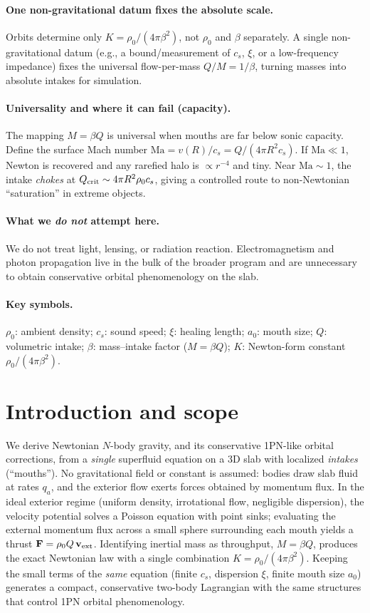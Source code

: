 \documentclass[11pt]{article}
\numberwithin{equation}{section}
\theoremstyle{plain}
\theoremstyle{remark}
\theoremstyle{definition}
\begin{document}
\paragraph{One non-gravitational datum fixes the absolute scale.}
Orbits determine only $K=\rho_0/(4\pi\beta^2)$, not $\rho_0$ and $\beta$ separately. A single non-gravitational datum (e.g., a bound/measurement of $c_s$, $\xi$, or a low-frequency impedance) fixes the universal flow-per-mass $Q/M=1/\beta$, turning masses into absolute intakes for simulation.

\paragraph{Universality and where it can fail (capacity).}
The mapping $M=\beta Q$ is universal when mouths are far below sonic capacity. Define the surface Mach number $\mathrm{Ma}=v(R)/c_s=Q/(4\pi R^2 c_s)$. If $\mathrm{Ma}\ll1$, Newton is recovered and any rarefied halo is $\propto r^{-4}$ and tiny. Near $\mathrm{Ma}\sim1$, the intake \emph{chokes} at $Q_{\rm crit}\sim4\pi R^2\rho_0 c_s$, giving a controlled route to non-Newtonian ``saturation'' in extreme objects.

\paragraph{What we \emph{do not} attempt here.}
We do not treat light, lensing, or radiation reaction. Electromagnetism and photon propagation live in the bulk of the broader program and are unnecessary to obtain conservative orbital phenomenology on the slab.

\paragraph{Key symbols.}
$\rho_0$: ambient density; $c_s$: sound speed; $\xi$: healing length; $a_0$: mouth size; $Q$: volumetric intake; $\beta$: mass--intake factor ($M=\beta Q$); $K$: Newton-form constant $\rho_0/(4\pi\beta^2)$.

\section{Introduction and scope}
\label{sec:intro}
We derive Newtonian $N$-body gravity, and its conservative 1PN-like orbital corrections, from a \emph{single} superfluid equation on a 3D slab with localized \emph{intakes} (``mouths''). No gravitational field or constant is assumed: bodies draw slab fluid at rates $q_a$, and the exterior flow exerts forces obtained by momentum flux.
In the ideal exterior regime (uniform density, irrotational flow, negligible dispersion), the velocity potential solves a Poisson equation with point sinks; evaluating the external momentum flux across a small sphere surrounding each mouth yields a thrust $\mathbf F=\rho_0 Q\,\mathbf v_{\rm ext}$. Identifying inertial mass as throughput, $M=\beta Q$, produces the exact Newtonian law with a single combination $K=\rho_0/(4\pi\beta^2)$. Keeping the small terms of the \emph{same} equation (finite $c_s$, dispersion $\xi$, finite mouth size $a_0$) generates a compact, conservative two-body Lagrangian with the same structures that control 1PN orbital phenomenology.
\end{document}
